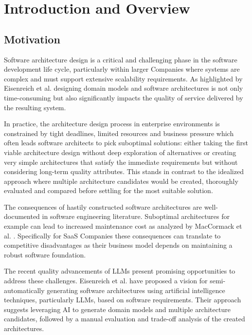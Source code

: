 
\chapter{Introduction and Overview}\label{chapter:introduction}

\section{Motivation}
Software architecture design is a critical and challenging phase in the software development life cycle, particularly within larger Companies where systems are complex and must support extensive scalability requirements. As highlighted by Eisenreich et al. \autocite{eisenreich2024} designing domain models and software architectures is not only time-consuming but also significantly impacts the quality of service delivered by the resulting system. 

In practice, the architecture design process in enterprise environments is constrained by tight deadlines, limited resources and business pressure which often leads software architects to pick suboptimal solutions: either taking the first viable architecture design without deep exploration of alternatives or creating very simple architectures that satisfy the immediate requirements but without considering long-term quality attributes. This stands in contrast to the idealized approach where multiple architecture candidates would be created, thoroughly evaluated and compared before settling for the most suitable solution. 

The consequences of hastily constructed software architectures are well-documented in software engineering literature. Suboptimal architectures for example can lead to increased maintenance cost as analyzed by MacCormack et al. \autocite{MACCORMACK2016170}. Specifically for SaaS Companies these consequences can translate to competitive disadvantages as their business model depends on maintaining a robust software foundation. 

The recent quality advancements of LLMs present promising opportunities to address these challenges. Eisenreich et al. \cite{eisenreich2024} have proposed a vision for semi-automatically generating software architectures using artificial intelligence techniques, particularly LLMs, based on software requirements. Their approach suggests leveraging AI to generate domain models and multiple architecture candidates, followed by a manual evaluation and trade-off analysis of the created architectures. 

